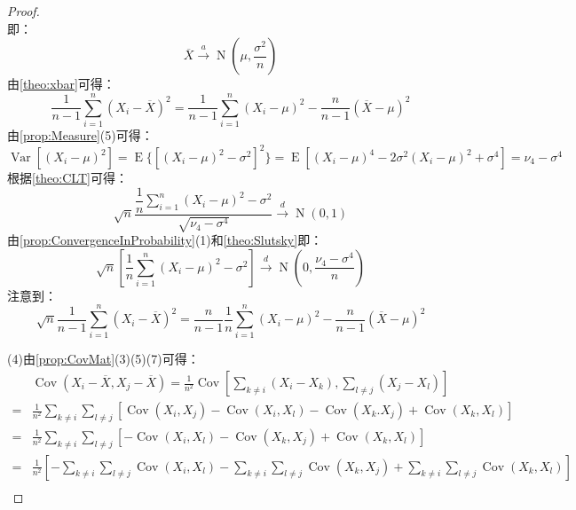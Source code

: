 \begin{proof}
\begin{equation*}
	\end{equation*}
	即：
	\begin{equation*}
		\overline{X}\overset{a}{\longrightarrow}\operatorname{N}\left(\mu,\frac{\sigma^2}{n}\right)
	\end{equation*}
	由\cref{theo:xbar}可得：
	\begin{equation*}
		\frac{1}{n-1}\sum_{i=1}^{n}(X_i-\overline{X})^2=\frac{1}{n-1}\sum_{i=1}^{n}(X_i-\mu)^2-\frac{n}{n-1}(\overline{X}-\mu)^2
	\end{equation*}
	由\cref{prop:Measure}(5)可得：
	\begin{equation*}
		\operatorname{Var}[(X_i-\mu)^2]=\operatorname{E}\{[(X_i-\mu)^2-\sigma^2]^2\}=\operatorname{E}[(X_i-\mu)^4-2\sigma^2(X_i-\mu)^2+\sigma^4]=\nu_4-\sigma^4
	\end{equation*}
	根据\cref{theo:CLT}可得：
	\begin{equation*}
		\sqrt{n}\frac{\dfrac{1}{n}\sum\limits_{i=1}^{n}(X_i-\mu)^2-\sigma^2}{\sqrt{\nu_4-\sigma^4}}\overset{d}{\longrightarrow}\operatorname{N}(0,1)
	\end{equation*}
	由\cref{prop:ConvergenceInProbability}(1)和\cref{theo:Slutsky}即：
	\begin{equation*}
		\sqrt{n}\left[\frac{1}{n}\sum_{i=1}^{n}(X_i-\mu)^2-\sigma^2\right]\overset{d}{\longrightarrow}\operatorname{N}\left(0,\frac{\nu_4-\sigma^4}{n}\right)
	\end{equation*}
	注意到：
	\begin{equation*}
		\sqrt{n}\frac{1}{n-1}\sum_{i=1}^{n}(X_i-\overline{X})^2=\frac{n}{n-1}\frac{1}{n}\sum_{i=1}^{n}(X_i-\mu)^2-\frac{n}{n-1}(\overline{X}-\mu)^2
	\end{equation*}\par
	(4)由\cref{prop:CovMat}(3)(5)(7)可得：
	\begin{align*}
		&\operatorname{Cov}(X_i-\overline{X},X_j-\overline{X})=\frac{1}{n^2}\operatorname{Cov}\left[\sum_{k\ne i}(X_i-X_k),\sum_{l\ne j}(X_j-X_l)\right] \\
		=&\frac{1}{n^2}\sum_{k\ne i}\sum_{l\ne j}[\operatorname{Cov}(X_i,X_j)-\operatorname{Cov}(X_i,X_l)-\operatorname{Cov}(X_k.X_j)+\operatorname{Cov}(X_k,X_l)] \\
		=&\frac{1}{n^2}\sum_{k\ne i}\sum_{l\ne j}[-\operatorname{Cov}(X_i,X_l)-\operatorname{Cov}(X_k,X_j)+\operatorname{Cov}(X_k,X_l)] \\
		=&\frac{1}{n^2}\left[-\sum_{k\ne i}\sum_{l\ne j}\operatorname{Cov}(X_i,X_l)-\sum_{k\ne i}\sum_{l\ne j}\operatorname{Cov}(X_k,X_j)+\sum_{k\ne i}\sum_{l\ne j}\operatorname{Cov}(X_k,X_l)\right] \\

\end{align*}
\end{proof}
